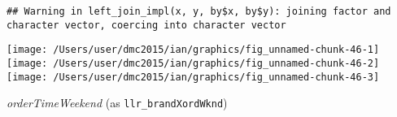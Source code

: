 \documentclass[10pt]{report}
\newenvironment{Shaded}{}{}
\newcommand{\KeywordTok}[1]{\textcolor[rgb]{0.00,0.44,0.13}{\textbf{{#1}}}}
\newcommand{\DataTypeTok}[1]{\textcolor[rgb]{0.56,0.13,0.00}{{#1}}}
\newcommand{\StringTok}[1]{\textcolor[rgb]{0.25,0.44,0.63}{{#1}}}
\newcommand{\NormalTok}[1]{{#1}}
\begin{document}
\begin{Shaded}
\end{Shaded}

\begin{verbatim}
## Warning in left_join_impl(x, y, by$x, by$y): joining factor and character vector, coercing into character vector
\end{verbatim}

\begin{Shaded}
\end{Shaded}

\begin{center}\texttt{[image: /Users/user/dmc2015/ian/graphics/fig\_unnamed-chunk-46-1]} \texttt{[image: /Users/user/dmc2015/ian/graphics/fig\_unnamed-chunk-46-2]} \texttt{[image: /Users/user/dmc2015/ian/graphics/fig\_unnamed-chunk-46-3]} \end{center}

\emph{orderTimeWeekend} (as \texttt{llr\_brandXordWknd})
\end{document}
